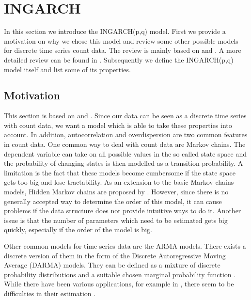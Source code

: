 \section{INGARCH}
\label{sec:Ingarch}

In this section we introduce the INGARCH(p,q) model. First we provide a motivation on why we chose this model and review some other possible models for discrete time series count data. The review is mainly based on \cite{Liboschik:2016} and \cite{Heinen:2003}. A more detailed review can be found in \cite{Zucchini:1997}. Subsequently we define the INGARCH(p,q) model itself and list some of its properties. 

\subsection{Motivation}
\label{sec:Ingarch Motivation}

This section is based on \cite{Liboschik:2016} and \cite{Heinen:2003}. \newline
Since our data can be seen as a discrete time series with count data, we want a model which is able to take these properties into account. In addition, autocorrelation and overdispersion are two common features in count data.  
One common way to deal with count data are Markov chains. The dependent variable can take on all possible values in the so called state space and the probability of changing states is then modelled as a transition probability. A limitation is the fact that these models become cumbersome if the state space gets too big and lose tractability. As an extension to the basic Markov chains models, Hidden Markov chains are proposed by \cite{Zucchini:1997}. However, since there is no generally accepted way to determine the order of this model, it can cause problems if the data structure does not provide intuitive ways to do it. Another issue is that the number of parameters which need to be estimated gets big quickly, especially if the order of the model is big. 

Other common models for time series data are the ARMA models. There exists a discrete version of them in the form of the Discrete Autoregressive Moving Average (DARMA) models. They can be defined as a mixture of discrete probability distributions and a suitable chosen marginal probability function \cite{Biswas:2009}. While there have been various applications, for example in \cite{Chang:1987}, there seem to be difficulties in their estimation \cite{Heinen:2003}. 

